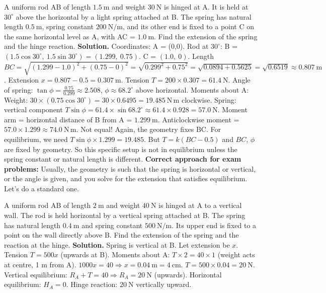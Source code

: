 \documentclass[11pt]{article}
\begin{document}
\begin{exoresolu}
A uniform rod AB of length $1.5\ \mathrm{m}$ and weight $30\ \mathrm{N}$ is hinged at A. It is held at $30^\circ$ above the horizontal by a light spring attached at B. The spring has natural length $0.5\ \mathrm{m}$, spring constant $200\ \mathrm{N/m}$, and its other end is fixed to a point C on the same horizontal level as A, with AC = $1.0\ \mathrm{m}$. Find the extension of the spring and the hinge reaction.
\tcblower
\textbf{Solution.}
Coordinates: A = (0,0). Rod at $30^\circ$: B = $(1.5\cos30^\circ,\ 1.5\sin30^\circ) = (1.299,\ 0.75)$.
C = $(1.0,\ 0)$.
Length $BC = \sqrt{(1.299-1.0)^2 + (0.75-0)^2} = \sqrt{0.299^2 + 0.75^2} = \sqrt{0.0894 + 0.5625} = \sqrt{0.6519} \approx 0.807\ \mathrm{m}$.
Extension $x = 0.807 - 0.5 = 0.307\ \mathrm{m}$.
Tension $T = 200 \times 0.307 = 61.4\ \mathrm{N}$.
Angle of spring: $\tan\phi = \frac{0.75}{0.299} \approx 2.508$, $\phi \approx 68.2^\circ$ above horizontal.
Moments about A:
Weight: $30 \times (0.75\cos30^\circ) = 30 \times 0.6495 = 19.485\ \mathrm{N\,m}$ clockwise.
Spring: vertical component $T\sin\phi = 61.4 \times \sin68.2^\circ \approx 61.4 \times 0.928 = 57.0\ \mathrm{N}$.
Moment arm = horizontal distance of B from A = $1.299\ \mathrm{m}$.
Anticlockwise moment = $57.0 \times 1.299 \approx 74.0\ \mathrm{N\,m}$.
Not equal! Again, the geometry fixes BC. For equilibrium, we need $T\sin\phi \times 1.299 = 19.485$.
But $T = k(BC - 0.5)$ and $BC$, $\phi$ are fixed by geometry. So this specific setup is not in equilibrium unless the spring constant or natural length is different.
\textbf{Correct approach for exam problems:} Usually, the geometry is such that the spring is horizontal or vertical, or the angle is given, and you solve for the extension that satisfies equilibrium. Let's do a standard one.
\end{exoresolu}

\begin{exoresolu}
A uniform rod AB of length $2\ \mathrm{m}$ and weight $40\ \mathrm{N}$ is hinged at A to a vertical wall. The rod is held horizontal by a vertical spring attached at B. The spring has natural length $0.4\ \mathrm{m}$ and spring constant $500\ \mathrm{N/m}$. Its upper end is fixed to a point on the wall directly above B. Find the extension of the spring and the reaction at the hinge.
\tcblower
\textbf{Solution.}
Spring is vertical at B. Let extension be $x$. Tension $T = 500x$ (upwards at B).
Moments about A: $T \times 2 = 40 \times 1$ (weight acts at centre, 1 m from A).
$1000x = 40 \Rightarrow x = 0.04\ \mathrm{m} = 4\ \mathrm{cm}$.
$T = 500 \times 0.04 = 20\ \mathrm{N}$.
Vertical equilibrium: $R_A + T = 40 \Rightarrow R_A = 20\ \mathrm{N}$ (upwards).
Horizontal equilibrium: $H_A = 0$.
Hinge reaction: $20\ \mathrm{N}$ vertically upward.
\end{exoresolu}
\end{document}
